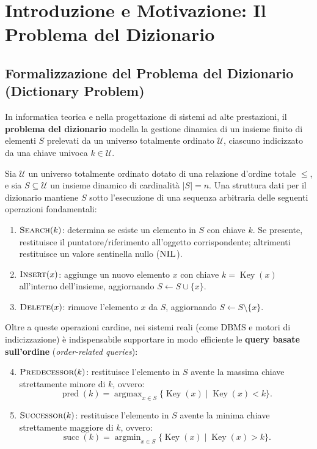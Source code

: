 \FloatBarrier
\section{Introduzione e Motivazione: Il Problema del Dizionario}
\label{sec:dictionary-problem-and-motivation}

\subsection{Formalizzazione del Problema del Dizionario (Dictionary Problem)}
In informatica teorica e nella progettazione di sistemi ad alte prestazioni, il \textbf{problema del dizionario} modella la gestione dinamica di un insieme finito di elementi $S$ prelevati da un universo totalmente ordinato $\mathcal{U}$, ciascuno indicizzato da una chiave univoca $k \in \mathcal{U}$.

\begin{definition}
Sia $\mathcal{U}$ un universo totalmente ordinato dotato di una relazione d'ordine totale $\le$, e sia $S \subseteq \mathcal{U}$ un insieme dinamico di cardinalità $|S| = n$. Una struttura dati per il dizionario mantiene $S$ sotto l'esecuzione di una sequenza arbitraria delle seguenti operazioni fondamentali:
\begin{enumerate}
  \item $\textsc{Search}(k)$: determina se esiste un elemento in $S$ con chiave $k$. Se presente, restituisce il puntatore/riferimento all'oggetto corrispondente; altrimenti restituisce un valore sentinella nullo ($\textsc{NIL}$).
  \item $\textsc{Insert}(x)$: aggiunge un nuovo elemento $x$ con chiave $k = \operatorname{Key}(x)$ all'interno dell'insieme, aggiornando $S \leftarrow S \cup \{x\}$.
  \item $\textsc{Delete}(x)$: rimuove l'elemento $x$ da $S$, aggiornando $S \leftarrow S \setminus \{x\}$.
\end{enumerate}
Oltre a queste operazioni cardine, nei sistemi reali (come DBMS e motori di indicizzazione) è indispensabile supportare in modo efficiente le \textbf{query basate sull'ordine} (\textit{order-related queries}):
\begin{enumerate}
  \setcounter{enumi}{3}
  \item $\textsc{Predecessor}(k)$: restituisce l'elemento in $S$ avente la massima chiave strettamente minore di $k$, ovvero:
  \begin{equation}
    \operatorname{pred}(k) = \operatorname{argmax}_{x \in S} \{\operatorname{Key}(x) \mid \operatorname{Key}(x) < k\}.
  \end{equation}
  \item $\textsc{Successor}(k)$: restituisce l'elemento in $S$ avente la minima chiave strettamente maggiore di $k$, ovvero:
  \begin{equation}
    \operatorname{succ}(k) = \operatorname{argmin}_{x \in S} \{\operatorname{Key}(x) \mid \operatorname{Key}(x) > k\}.
  \end{equation}
\end{enumerate}
\end{definition}

